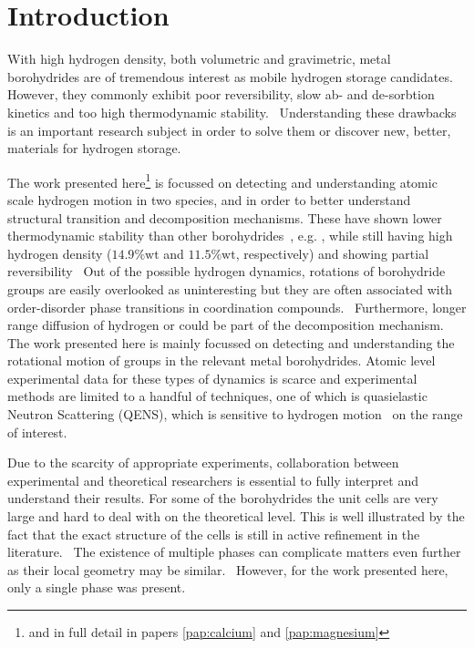 \section{Introduction}
\label{sec:borohydrides-introduction}
With high hydrogen density, both volumetric and gravimetric, metal borohydrides are of tremendous interest as mobile hydrogen storage candidates.
However, they commonly exhibit poor reversibility, slow ab- and de-sorbtion kinetics and too high thermodynamic stability.~\cite{lithium-stability-2003, borohydride-stability-2006, calcium-stability-2006}
Understanding these drawbacks is an important research subject in order to solve them or discover new, better, materials for hydrogen storage.

The work presented here\footnote{and in full detail in papers \ref{pap:calcium} and \ref{pap:magnesium}} is focussed on detecting and understanding atomic scale hydrogen motion in two species,  and  in order to better understand structural transition and decomposition mechanisms.
These have shown lower thermodynamic stability than other borohydrides~\cite{borohydride-stability-2006, calcium-stability-2006}, e.g. , while still having high hydrogen density ($14.9\%\text{wt}$ and $11.5\%\text{wt}$, respectively) and showing partial reversibility~\cite{magnesium-reversibility-severa-2010, magnesium-reversibility-chong-2011, calcium-reversibility-2007, calcium-reversibility-2008, reversibility-destabilisation-2008}
Out of the possible hydrogen dynamics, rotations of borohydride groups are easily overlooked as uninteresting but they are often associated with order-disorder phase transitions in coordination compounds.~\cite{order-disorder-2006, order-disorder-2010}
Furthermore, longer range diffusion of hydrogen or  could be part of the decomposition mechanism.
The work presented here is mainly focussed on detecting and understanding the rotational motion of  groups in the relevant metal borohydrides.
Atomic level experimental data for these types of dynamics is scarce and experimental methods are limited to a handful of techniques, one of which is quasielastic Neutron Scattering (QENS), which is sensitive to hydrogen motion~\cite{qens-bee-1988} on the range of interest.

Due to the scarcity of appropriate experiments, collaboration between experimental and theoretical researchers is essential to fully interpret and understand their results.
For some of the borohydrides the unit cells are very large and hard to deal with on the theoretical level.
This is well illustrated by the fact that the exact structure of the cells is still in active refinement in the literature.~\cite{cabh42-structure-p42m, cabh42-structure-p4}
The existence of multiple phases can complicate matters even further as their local geometry may be similar.~\cite{mgbh42-structure-fddd, mgbh42-phases-2007, mgbh42-phases-2008, mgbh42-phases-2009}
However, for the work presented here, only a single phase was present.
